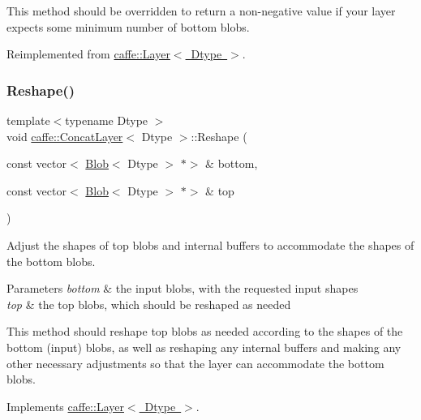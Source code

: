 This method should be overridden to return a non-\/negative value if your layer expects some minimum number of bottom blobs. 

Reimplemented from \mbox{\hyperlink{classcaffe_1_1_layer_aca3cb2bafaefda5d4760aaebd0b72def}{caffe\+::\+Layer$<$ Dtype $>$}}.

\mbox{\label{classcaffe_1_1_concat_layer_a3c7cbd500d3a15cfbdbf33479c4fb228}} 
\subsubsection{\texorpdfstring{Reshape()}{Reshape()}\hspace{0.1cm}{\footnotesize\ttfamily [1/2]}}
{\footnotesize\ttfamily template$<$typename Dtype $>$ \\
void \mbox{\hyperlink{classcaffe_1_1_concat_layer}{caffe\+::\+Concat\+Layer}}$<$ Dtype $>$\+::Reshape (\begin{DoxyParamCaption}\item[{const vector$<$ \mbox{\hyperlink{classcaffe_1_1_blob}{Blob}}$<$ Dtype $>$ $\ast$$>$ \&}]{bottom,  }\item[{const vector$<$ \mbox{\hyperlink{classcaffe_1_1_blob}{Blob}}$<$ Dtype $>$ $\ast$$>$ \&}]{top }\end{DoxyParamCaption})\hspace{0.3cm}{\ttfamily [virtual]}}



Adjust the shapes of top blobs and internal buffers to accommodate the shapes of the bottom blobs. 


\begin{DoxyParams}{Parameters}
{\em bottom} & the input blobs, with the requested input shapes \\
\hline
{\em top} & the top blobs, which should be reshaped as needed\\
\hline
\end{DoxyParams}
This method should reshape top blobs as needed according to the shapes of the bottom (input) blobs, as well as reshaping any internal buffers and making any other necessary adjustments so that the layer can accommodate the bottom blobs. 

Implements \mbox{\hyperlink{classcaffe_1_1_layer_a7fe981e8af8d93d587acf2a952be563d}{caffe\+::\+Layer$<$ Dtype $>$}}.

